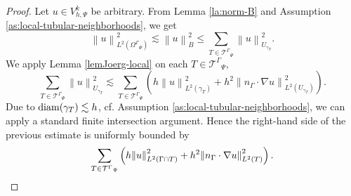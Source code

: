 \documentclass[final]{siamltex}
\begin{document}
\begin{proof}
Let $u\in V_{h,\Psi}^k$ be arbitrary. From Lemma \ref{la:norm-B} and Assumption \ref{as:local-tubular-neighborhoods}, we get
\[
  {\left\lVert {u} \right\rVert}_{L^2({\Omega^{\Gamma}}_\Psi)}^2 \lesssim {\left\lVert {u} \right\rVert}_B^2\le \sum_{T\in{{\mathcal{T}}^{\Gamma}}_\Psi} {\left\lVert {u} \right\rVert}_{U_{\gamma_T}}^2.
\]
We apply Lemma \ref{lemJoerg-local} on each $T\in{{\mathcal{T}}^{\Gamma}}_\Psi$,
\[
  \sum_{T\in{{\mathcal{T}}^{\Gamma}}_\Psi} {\left\lVert {u} \right\rVert}_{U_{\gamma_T}}^2 \lesssim \sum_{T\in{{\mathcal{T}}^{\Gamma}}_\Psi}\left( h{\left\lVert {u} \right\rVert}_{L^2(\gamma_T)}^2 + h^2{\left\lVert {n_\Gamma\cdot\nabla u} \right\rVert}_{L^2(U_{\gamma_T})}^2 \right).
\]
Due to ${\rm diam}(\gamma_T) \lesssim h$, cf. Assumption \ref{as:local-tubular-neighborhoods}, we can apply a standard finite intersection argument. Hence the right-hand side of the previous estimate is uniformly bounded by \vspace*{-0.25cm}
\[
  \sum_{T\in{{\mathcal{T}}^{\Gamma}}_\Psi}\left( h{\left\lVert {u} \right\rVert}_{L^2(\Gamma\cap T)}^2 + h^2{\left\lVert {n_\Gamma\cdot\nabla u} \right\rVert}_{L^2(T)}^2 \right).\vspace*{-0.25cm}
 
\]
\end{proof}
\end{document}
